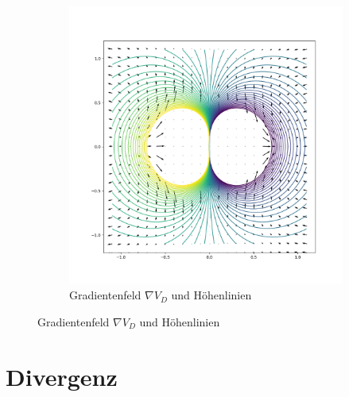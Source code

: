 \documentclass[11pt]{article}
\theoremstyle{plain}
\theoremstyle{definition}
\theoremstyle{remark}
\begin{document}
\begin{itemize}
\begin{figure}[h]
\begin{subfigure}{0.5\textwidth}
		\includegraphics[width=\textwidth]{VD.png} 
		\caption{Gradientenfeld $\nabla V_D$ und Höhenlinien }
	\end{subfigure}
\end{figure}

\end{itemize}


\section{Divergenz}
\end{document}
